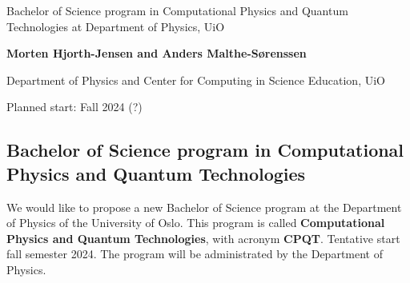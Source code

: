 \documentclass[%
oneside,                 %
final,                   %
10pt]{article}
\begin{document}

\newcommand{\exercisesection}[1]{\subsection*{#1}}






\thispagestyle{empty}

\begin{center}
{\LARGE\bf
\begin{spacing}{1.25}
Bachelor of Science program in Computational Physics and Quantum Technologies  at Department of Physics, UiO
\end{spacing}
}
\end{center}


\begin{center}
{\bf Morten Hjorth-Jensen and Anders Malthe-Sørenssen}
\end{center}

    \begin{center}
\centerline{{\small Department of Physics and Center for Computing in Science Education, UiO}}
\end{center}
    


\begin{center}
Planned start: Fall 2024 (?)
\end{center}

\vspace{1cm}


\subsection*{Bachelor of Science program in Computational Physics and Quantum Technologies}

We would like to propose a new Bachelor of Science program at the
Department of Physics of the University of Oslo. This program is
called \textbf{Computational Physics and Quantum Technologies}, with acronym
\textbf{CPQT}. Tentative start fall semester 2024.
The program will be administrated by the Department of Physics. 
\end{document}
